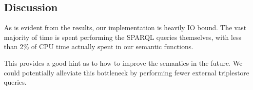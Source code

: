 \documentclass[../main.tex]{subfiles}
\begin{document}
\subsection{Discussion}

As is evident from the results, our implementation is heavily IO bound.
The vast majority of time is spent performing the SPARQL queries themselves, with
less than 2\% of CPU time actually spent in our semantic functions.

This provides a good hint as to how to improve the semantics in the future.
We could potentially alleviate this bottleneck by performing fewer external triplestore queries.
\end{document}
